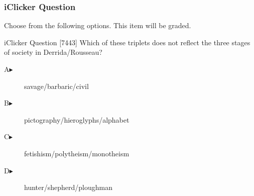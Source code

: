 \begin{frame}
  \frametitle{iClicker Question}
Choose from the following options. This item will be graded.
\begin{block}{iClicker Question}
[7443] Which of these triplets does not reflect the three stages of society in Derrida/Rousseau?
\end{block}
\begin{description}
\item[A\hspace{.2in}$\blacktriangleright$] savage/barbaric/civil
\item[B\hspace{.2in}$\blacktriangleright$] pictography/hieroglyphs/alphabet
\item[C\hspace{.2in}$\blacktriangleright$] fetishism/polytheism/monotheism
\item[D\hspace{.2in}$\blacktriangleright$] hunter/shepherd/ploughman
\end{description}
\end{frame}
